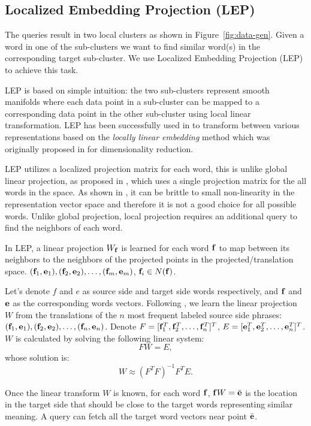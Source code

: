 \documentclass[a4paper]{article}
\begin{document}
\subsection{Localized Embedding Projection (LEP)}
\label{sec:lep}
The \knn queries result in two local clusters as shown in Figure~\ref{fig:data-gen}. Given a word in one of the sub-clusters we want to find similar word(s) in the corresponding target sub-cluster. We use  Localized Embedding Projection (LEP) to achieve this task.

LEP  is based on simple intuition: the two sub-clusters represent smooth manifolds where each data point in a sub-cluster can be mapped to a corresponding data point in the other sub-cluster using  local linear transformation.  LEP has been successfully used  in \cite{ZhaoHA15} to transform between various representations based on the {\it locally linear embedding} method which was originally  proposed in \cite{roweis2000nonlinear} for dimensionality reduction. 


LEP utilizes a localized projection matrix for each word, this is unlike global linear projection, as proposed in \cite{MikolovSCCD13}, which uses a single projection matrix for the all words in the space. As shown in \cite{ZhaoHA15}, it can be brittle to small non-linearity in the representation vector space and therefore  it is not a good choice  for all possible words. Unlike global projection, local projection requires an additional \knn query to find the neighbors of each word. 


In LEP,  a linear projection $W_\mathbf{f}$ is learned for each word $\mathbf{f}$  to map between its neighbors to the neighbors of the projected  points in the  projected/translation space.
$(\mathbf{f}_1, \mathbf{e}_1), (\mathbf{f}_2, \mathbf{e}_2), \dots, (\mathbf{f}_m, \mathbf{e}_m)$, $\mathbf{f}_i\in N(\mathbf{f})$.

Let's  denote $f$ and $e$ as source side and target side words
respectively, and $\mathbf{f}$ and $\mathbf{e}$ as the corresponding words vectors. Following \cite{MikolovSCCD13},
we learn the linear projection $W$ 
from the translations of the $n$ most frequent labeled source side phrases:
$(\mathbf{f}_1, \mathbf{e}_1), (\mathbf{f}_2, \mathbf{e}_2), \dots, (\mathbf{f}_n, \mathbf{e}_n)$. 
Denote $F=[\mathbf{f}_1^T, \mathbf{f}_2^T, \dots, \mathbf{f}_n^T]^T$, 
$E = [\mathbf{e}_1^T, \mathbf{e}_2^T, \dots, \mathbf{e}_n^T]^T$.
$W$ is calculated by solving the following linear system:
\[FW = E,\]
whose solution is: 
\[W \approx(F^TF)^{-1}F^TE.\]

Once the linear transform $W$ is known,
for each word $\mathbf{f}$,
$\mathbf{f} W=\bar{\mathbf{e}}$ is the location in the target side 
that should be close to the target words representing similar meaning.
A \knn query can fetch all the target word vectors near point $\bar{\mathbf{e}}$.
\end{document}
